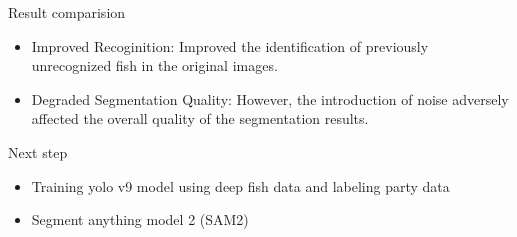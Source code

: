 \begin{frame}{Result comparision}
    \begin{itemize}
        \item Improved Recoginition: Improved the identification of previously unrecognized fish in the original images.
        \item Degraded Segmentation Quality: However, the introduction of noise adversely affected the overall quality of the segmentation results.
    \end{itemize}    
    
   
\end{frame}



\begin{frame}{Next step}
    \begin{itemize}
        \item Training yolo v9 model using deep fish data and labeling party data
        \item Segment anything model 2 (SAM2)
    \end{itemize}
    
   
\end{frame}











